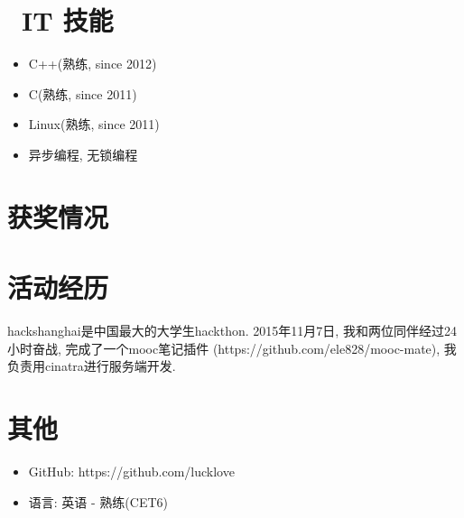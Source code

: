 \documentclass{resume}
\begin{document}

\section{\faCogs\ IT 技能}
\begin{itemize}[parsep=0.5ex]
  \item C++(熟练, since 2012)
  \item C(熟练, since 2011)
  \item Linux(熟练, since 2011)
  \item 异步编程, 无锁编程
\end{itemize}

\section{\faHeartO 获奖情况}

\section{\faUsers 活动经历}
hackshanghai是中国最大的大学生hackthon. 
2015年11月7日, 我和两位同伴经过24小时奋战, 
完成了一个mooc笔记插件
(https://github.com/ele828/mooc-mate),
我负责用cinatra进行服务端开发. 

\section{\faInfo 其他}
\begin{itemize}[parsep=0.5ex]
  \item GitHub: https://github.com/lucklove
  \item 语言: 英语 - 熟练(CET6)
\end{itemize}

%
%
\end{document}

